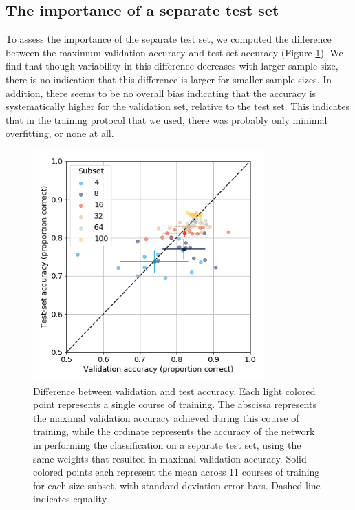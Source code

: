 \subsection{The importance of a separate test set}

To assess the importance of the separate test set, we computed the difference
between the maximum validation accuracy and test set accuracy (Figure
\ref{fig_diff}). We find that though variability in this difference decreases
with larger sample size, there is no indication that this difference is larger
for smaller sample sizes. In addition, there seems to be no overall bias
indicating that the accuracy is systematically higher for the validation set,
relative to the test set. This indicates that in the training protocol that we
used, there was probably only minimal overfitting, or none at all.

\begin{figure}[!t]
\centering
\includegraphics[width=3.5in]{./figures/diff}

\caption{Difference between validation and test accuracy. Each light colored
point represents a single course of training. The abscissa represents the
maximal validation accuracy achieved during this course of training, while the
ordinate represents the accuracy of the network in performing the classification
on a separate test set, using the same weights that resulted in maximal
validation accuracy. Solid colored points each represent the mean across 11
courses of training for each size subset, with standard deviation error bars. 
Dashed line indicates equality.}

\label{fig_diff}
\end{figure}
